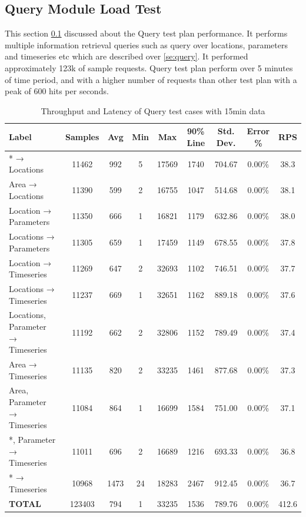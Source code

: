 \subsection{Query Module Load Test}
\label{subse:obs_test_plan_query_15min}
This section \ref{subse:obs_test_plan_query_15min} discussed about the Query test plan performance. It performs multiple information retrieval queries such as query over locations, parameters and timeseries etc which are described over \ref{se:query}. It performed approximately 123k of sample requests.
Query test plan perform over 5 minutes of time period, and with a higher number of requests than other test plan with a peak of 600 hits per seconds.

\begin{table}[ht]
\caption{Throughput and Latency of Query test cases with 15min data}
\footnotesize
\begin{tabulary}{\linewidth}{|L|C|C|C|C|C|C|C|C|}
\hline
Label & Samples & Avg & Min & Max & 90\% Line & Std. Dev. & Error \% & RPS \\ \hline
* → Locations & 11462 & 992 & 5 & 17569 & 1740 & 704.67 & 0.00\% & 38.3 \\ \hline
Area → Locations & 11390 & 599 & 2 & 16755 & 1047 & 514.68 & 0.00\% & 38.1 \\ \hline
Location → Parameters & 11350 & 666 & 1 & 16821 & 1179 & 632.86 & 0.00\% & 38.0 \\ \hline
Locations → Parameters & 11305 & 659 & 1 & 17459 & 1149 & 678.55 & 0.00\% & 37.8 \\ \hline
Location → Timeseries & 11269 & 647 & 2 & 32693 & 1102 & 746.51 & 0.00\% & 37.7 \\ \hline
Locations → Timeseries & 11237 & 669 & 1 & 32651 & 1162 & 889.18 & 0.00\% & 37.6 \\ \hline
Locations, Parameter → Timeseries & 11192 & 662 & 2 & 32806 & 1152 & 789.49 & 0.00\% & 37.4 \\ \hline
Area → Timeseries & 11135 & 820 & 2 & 33235 & 1461 & 877.68 & 0.00\% & 37.3 \\ \hline
Area, Parameter → Timeseries & 11084 & 864 & 1 & 16699 & 1584 & 751.00 & 0.00\% & 37.1 \\ \hline
*, Parameter → Timeseries & 11011 & 696 & 2 & 16689 & 1216 & 693.33 & 0.00\% & 36.8 \\ \hline
* → Timeseries & 10968 & 1473 & 24 & 18283 & 2467 & 912.45 & 0.00\% & 36.7 \\ \hline
\textbf{TOTAL} & 123403 & 794 & 1 & 33235 & 1536 & 789.76 & 0.00\% & 412.6 \\ \hline
\end{tabulary}
\label{tab:obs_query_15_min_summary}
\end{table}
